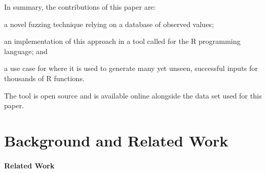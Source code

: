 \documentclass[sigplan,anonymous,review]{acmart}
\begin{document}


In summary, the contributions of this paper are:
%
\begin{inparaenum}[(1)]
    \item a novel fuzzing technique relying on a database of observed values;
    \item an implementation of this approach in a tool called \tool for the R programming language; and
    \item a use case for \tool where it is used to generate many yet unseen, successful inputs for thousands of R functions.
\end{inparaenum} 

The tool is open source and is available online alongside the data set used for this paper.

\section{Background and Related Work}
\label{sec:background}

\paragraph{Related Work}
\end{document}
